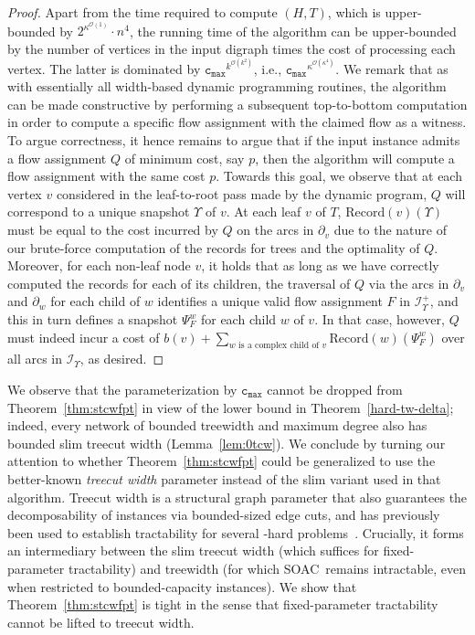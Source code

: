 \documentclass[letterpaper]{article} %
\newcommand{\bigoh}{\ensuremath{{\mathcal O}}}
\newcommand{\problem}{{\sc SOAC}\xspace} %
\newcommand{\cmax}{\mathtt{c_{max}}}
\newcommand{\Rec}{\text{Record}}
\begin{document}
\begin{proof}
Apart from the time required to compute $(H,T)$, which is upper-bounded by $2^{\kappa^{\bigoh(1)}}\cdot n^4$,
the running time of the algorithm can be upper-bounded by the number of vertices in the input digraph times the cost of processing each vertex. The latter is dominated by $\cmax^{k^{\bigoh(k^2)}}$, i.e., $\cmax^{\kappa^{\bigoh(\kappa^4)}}$. We remark that as with essentially all width-based dynamic programming routines, the algorithm can be made constructive by performing a subsequent top-to-bottom computation in order to compute a specific flow assignment with the claimed flow as a witness. To argue correctness, it hence remains to argue that if the input instance admits a flow assignment $Q$ of minimum cost, say $p$, then the algorithm will compute a flow assignment with the same cost $p$. Towards this goal, we observe that at each vertex $v$ considered in the leaf-to-root pass made by the dynamic program, $Q$ will correspond to a unique snapshot $\Upsilon$ of $v$. At each leaf $v$ of $T$, $\Rec(v)(\Upsilon)$ must be equal to the cost incurred by $Q$ on the arcs in $\partial_v$ due to the nature of our brute-force computation of the records for trees and the optimality of $Q$. Moreover, for each non-leaf node $v$, it holds that as long as we have correctly computed the records for each of its children, the traversal of $Q$ via the arcs in $\partial_v$ and $\partial_w$ for each child of $w$ identifies a unique valid flow assignment $F$ in $\mathcal{I}^+_\Upsilon$, and this in turn defines a snapshot $\Psi^w_F$ for each child $w$ of $v$. In that case, however, $Q$ must indeed incur a cost of $b(v)+\sum_{w\text{ is a complex child of }v}\Rec(w)(\Psi^w_F)$ over all arcs in $\mathcal{I}_\Upsilon$, as desired.
\end{proof}

We observe that the parameterization by $\cmax$ cannot be dropped from Theorem~\ref{thm:stcwfpt} in view of the lower bound in Theorem~\ref{hard-tw-delta}; indeed, every network of bounded treewidth and maximum degree also has bounded slim treecut width (Lemma~\ref{lem:0tcw}). We conclude by turning our attention to whether Theorem~\ref{thm:stcwfpt} could be generalized to use the better-known \emph{treecut width} parameter instead of the slim variant used in that algorithm. Treecut width is a structural graph parameter that also guarantees the decomposability of instances via bounded-sized edge cuts, and has previously been used to establish tractability for several \NP-hard problems~\cite{GanianKS22}. Crucially, it forms an intermediary between the slim treecut width (which suffices for fixed-parameter tractability) and treewidth (for which \problem\ remains intractable, even when restricted to bounded-capacity instances). We show that Theorem~\ref{thm:stcwfpt} is tight in the sense that fixed-parameter tractability cannot be lifted to treecut width.
\end{document}
